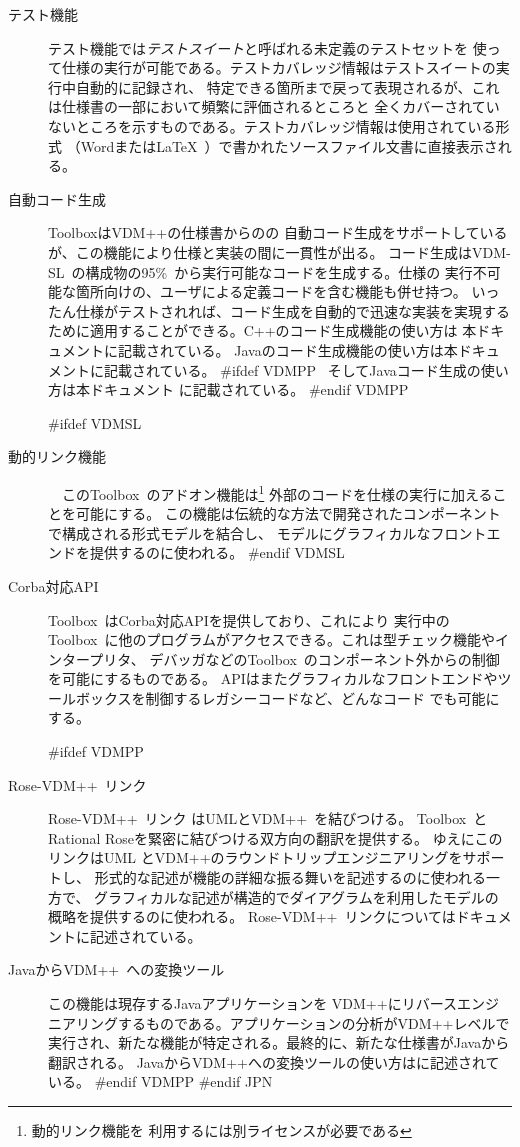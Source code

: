 \documentclass[\pformat,12pt]{article}
\def\vdmpp{{\small VDM}++}
\newcommand{\vdmslpp}{VDM-SL}
\newcommand{\Toolbox}{Toolbox}
\newcommand{\vdmslpp}{VDM++}
\newcommand{\Toolbox}{Toolbox}
\begin{document}
\begin{description}
\item[テスト機能] テスト機能では{\em テストスイート\/}と呼ばれる未定義のテストセットを
使って仕様の実行が可能である。テストカバレッジ情報はテストスイートの実行中自動的に記録され、
特定できる箇所まで戻って表現されるが、これは仕様書の一部において頻繁に評価されるところと
全くカバーされていないところを示すものである。テストカバレッジ情報は使用されている形式
（Wordまたは\LaTeX\ ）で書かれたソースファイル文書に直接表示される。

\item[自動コード生成] ToolboxはVDM++の仕様書からのの
自動コード生成をサポートしているが、この機能により仕様と実装の間に一貫性が出る。
コード生成は\vdmslpp\ の構成物の95\%\ から実行可能なコードを生成する。仕様の
実行不可能な箇所向けの、ユーザによる定義コードを含む機能も併せ持つ。
いったん仕様がテストされれば、コード生成を自動的で迅速な実装を実現するために適用することができる。C++のコード生成機能の使い方は
本ドキュメントに記載されている。
Javaのコード生成機能の使い方は本ドキュメントに記載されている。
#ifdef VDMPP
\ そしてJavaコード生成の使い方は本ドキュメント
\cite{CGJavaManPP-CSK}に記載されている。
#endif VDMPP

#ifdef VDMSL
\item[動的リンク機能]　この\Toolbox\ のアドオン機能は\footnote{動的リンク機能を
利用するには別ライセンスが必要である} 外部のコードを仕様の実行に加えることを可能にする。
この機能は伝統的な方法で開発されたコンポーネントで構成される形式モデルを結合し、
モデルにグラフィカルなフロントエンドを提供するのに使われる。
#endif VDMSL

\item[Corba対応API] \Toolbox\ はCorba対応APIを提供しており、これにより
実行中の\Toolbox\ に他のプログラムがアクセスできる。これは型チェック機能やインタープリタ、
デバッガなどの\Toolbox\ のコンポーネント外からの制御を可能にするものである。
APIはまたグラフィカルなフロントエンドやツールボックスを制御するレガシーコードなど、どんなコード
でも可能にする。

#ifdef VDMPP
\item[Rose-\vdmpp\ リンク] Rose-\vdmpp\ リンク はUMLと\vdmpp\ を結びつける。
\Toolbox\ とRational Roseを緊密に結びつける双方向の翻訳を提供する。
ゆえにこのリンクはUML と\vdmpp のラウンドトリップエンジニアリングをサポートし、
形式的な記述が機能の詳細な振る舞いを記述するのに使われる一方で、
グラフィカルな記述が構造的でダイアグラムを利用したモデルの概略を提供するのに使われる。
Rose-\vdmpp\ リンクについてはドキュメント\cite{UMLMan-CSK}に記述されている。

\item[Javaから\vdmpp\ への変換ツール] この機能は現存するJavaアプリケーションを
\vdmpp にリバースエンジニアリングするものである。アプリケーションの分析が\vdmpp レベルで
実行され、新たな機能が特定される。最終的に、新たな仕様書がJavaから翻訳される。
Javaから\vdmpp への変換ツールの使い方は\cite{Java2VDMMan-CSK}に記述されている。
#endif VDMPP
#endif JPN

\end{description}
\end{document}
